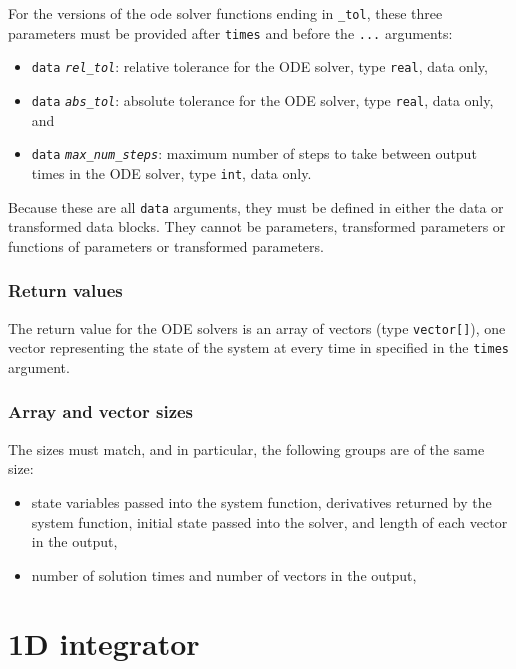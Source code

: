 \documentclass[
  10pt,
]{book}
\begin{document}
For the versions of the ode solver functions ending in \texttt{\_tol}, these three
parameters must be provided after \texttt{times} and before the \texttt{...} arguments:

\begin{itemize}
\item
  \texttt{data} \emph{\texttt{rel\_tol}}: relative tolerance for the ODE solver, type \texttt{real},
  data only,
\item
  \texttt{data} \emph{\texttt{abs\_tol}}: absolute tolerance for the ODE solver, type \texttt{real},
  data only, and
\item
  \texttt{data} \emph{\texttt{max\_num\_steps}}: maximum number of steps to take between output
  times in the ODE solver, type \texttt{int}, data only.
\end{itemize}

Because these are all \texttt{data} arguments, they must be defined in either the data
or transformed data blocks. They cannot be parameters, transformed parameters
or functions of parameters or transformed parameters.

\hypertarget{return-values}{%
\subsubsection{Return values}\label{return-values}}

The return value for the ODE solvers is an array of vectors (type \texttt{vector{[}{]}}),
one vector representing the state of the system at every time in specified in
the \texttt{times} argument.

\hypertarget{array-and-vector-sizes}{%
\subsubsection{Array and vector sizes}\label{array-and-vector-sizes}}

The sizes must match, and in particular, the following groups are of
the same size:

\begin{itemize}
\item
  state variables passed into the system function, derivatives
  returned by the system function, initial state passed into the
  solver, and length of each vector in the output,
\item
  number of solution times and number of vectors in the output,
\end{itemize}

\hypertarget{functions-1d-integrator}{%
\section{1D integrator}\label{functions-1d-integrator}}
\end{document}
